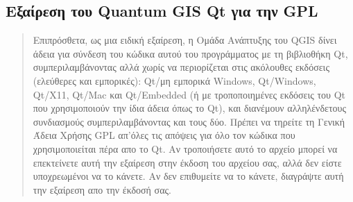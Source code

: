 \subsection{Εξαίρεση του Quantum GIS Qt για την GPL}\label{qgis_qt_exception_appendix}

\begin{quotation}
Επιπρόσθετα, ως μια ειδική εξαίρεση, η Ομάδα Ανάπτυξης του QGIS δίνει άδεια για σύνδεση του κώδικα αυτού του προγράμματος με τη βιβλιοθήκη Qt, συμπεριλαμβάνοντας αλλά χωρίς να περιορίζεται στις ακόλουθες εκδόσεις (ελεύθερες και εμπορικές): Qt/μη εμπορικά Windows, Qt/Windows, Qt/X11, Qt/Mac και Qt/Embedded (ή με τροποποιημένες εκδόσεις του Qt που χρησιμοποιούν την ίδια άδεια όπως το Qt), και διανέμουν αλληλένδετους συνδιασμούς συμπεριλαμβάνοντας και τους δύο. Πρέπει να τηρείτε τη Γενική Άδεια Χρήσης GPL απ'όλες τις απόψεις για όλο τον κώδικα που χρησιμοποιείται πέρα απο το Qt. Αν τροποιήσετε αυτό το αρχείο μπορεί να επεκτείνετε αυτή την εξαίρεση στην έκδοση του αρχείου σας, αλλά δεν είστε υποχρεωμένοι να το κάνετε. Αν δεν επιθυμείτε να το κάνετε, διαγράψτε αυτή την εξαίρεση απο την έκδοσή σας. 
\end{quotation} 
